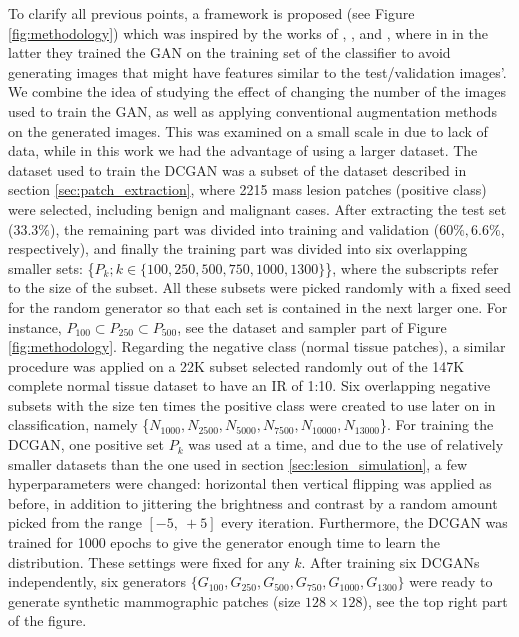 \documentclass[final,3p,twocolumn,authoryear,sort&compress,times]{maia}
\begin{document}
To clarify all previous points, a framework is proposed (see Figure \ref{fig:methodology}) which was inspired by the works of \citet{liver_aug}, \citet{GAN_brain_aug}, and \citet{imb_learn_Portu}, where in in the latter they trained the GAN on the training set of the classifier to avoid generating images that might have features similar to the test/validation images'. We combine the idea of studying the effect of changing the number of the images used to train the GAN, as well as applying conventional augmentation methods on the generated images. This was examined on a small scale in \citet{liver_aug} due to lack of data, while in this work we had the advantage of using a larger dataset. The dataset used to train the DCGAN was a subset of the dataset described in section \ref{sec:patch_extraction}, where 2215 mass lesion patches  (positive class) were selected, including benign and malignant cases. After extracting the test set ($33.3\%$), the remaining part was divided into training and validation ($60\%, 6.6\%$, respectively), and finally the training part was divided into six overlapping smaller sets:
\{$P_k; k \in \{100, 250, 500, 750, 1000, 1300\}$\}, where the subscripts refer to the size of the subset. All these subsets were picked randomly with a fixed seed for the random generator so that each set is contained in the next larger one. For instance, $P_{100} \subset P_{250} \subset P_{500}$, see the dataset and sampler part of Figure \ref{fig:methodology}. Regarding the negative class (normal tissue patches), a similar procedure was applied on a 22K subset selected randomly out of the 147K complete normal tissue dataset to have an IR of 1:10. Six overlapping negative subsets with the size ten times the positive class were created to use later on in classification, namely \{$N_{1000}, N_{2500}, N_{5000}, N_{7500}, N_{10000}, N_{13000}$\}. For training the DCGAN, one positive set $P_k$ was used at a time, and due to the use of relatively smaller datasets than the one used in section \ref{sec:lesion_simulation}, a few hyperparameters were changed: horizontal then vertical flipping was applied as before, in addition to jittering the brightness and contrast by a random amount picked from the range $[-5,\ +5]$ every iteration. Furthermore, the DCGAN was trained for 1000 epochs to give the generator enough time to learn the distribution. These settings were fixed for any $k$. After training six DCGANs independently, six generators $\{G_{100}, G_{250}, G_{500}, G_{750}, G_{1000}, G_{1300}\}$ were ready to generate synthetic mammographic patches (size $128 \times 128$), see the top right part of the figure.
\end{document}
